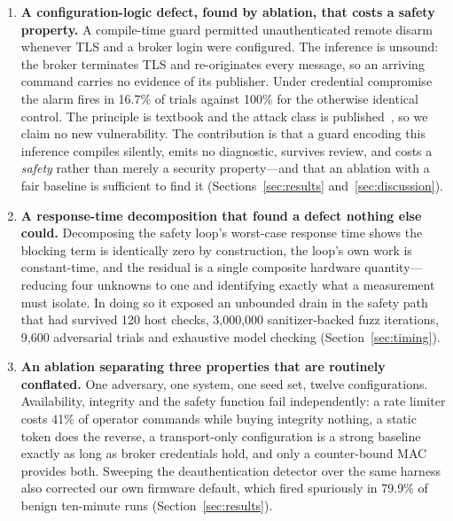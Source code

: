 \begin{enumerate}[leftmargin=1.4em,itemsep=0.25em]
\item \textbf{A configuration-logic defect, found by ablation, that costs a safety property.}
A compile-time guard permitted unauthenticated remote disarm whenever TLS and a broker login
were configured. The inference is unsound: the broker terminates TLS and re-originates every
message, so an arriving command carries no evidence of its publisher. Under credential
compromise the alarm fires in 16.7\% of trials against 100\% for the otherwise identical
control. The principle is textbook and the attack class is published~\cite{pirates2024}, so we
claim no new vulnerability. The contribution is that a guard encoding this inference compiles
silently, emits no diagnostic, survives review, and costs a \emph{safety} rather than merely a
security property---and that an ablation with a fair baseline is sufficient to find it
(Sections~\ref{sec:results} and~\ref{sec:discussion}).

\item \textbf{A response-time decomposition that found a defect nothing else could.}
Decomposing the safety loop's worst-case response time shows the blocking term is identically
zero by construction, the loop's own work is constant-time, and the residual is a single
composite hardware quantity---reducing four unknowns to one and identifying exactly what a
measurement must isolate. In doing so it exposed an unbounded drain in the safety path that had
survived 120 host checks, 3{,}000{,}000 sanitizer-backed fuzz iterations, 9{,}600 adversarial
trials and exhaustive model checking (Section~\ref{sec:timing}).

\item \textbf{An ablation separating three properties that are routinely conflated.} One
adversary, one system, one seed set, twelve configurations. Availability, integrity and the
safety function fail independently: a rate limiter costs 41\% of operator commands while buying
integrity nothing, a static token does the reverse, a transport-only configuration is a strong
baseline exactly as long as broker credentials hold, and only a counter-bound MAC provides
both. Sweeping the deauthentication detector over the same harness also corrected our own
firmware default, which fired spuriously in 79.9\% of benign ten-minute runs
(Section~\ref{sec:results}).


\end{enumerate}
